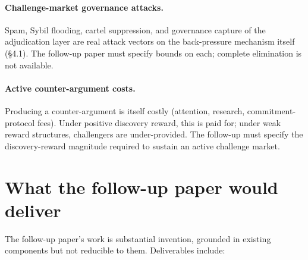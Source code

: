 \documentclass{article}
\begin{document}
\paragraph{Challenge-market governance attacks.}
Spam, Sybil flooding, cartel suppression, and governance capture
of the adjudication layer are real attack vectors on the
back-pressure mechanism itself (\S4.1).  The follow-up paper
must specify bounds on each; complete elimination is not
available.

\paragraph{Active counter-argument costs.}
Producing a counter-argument is itself costly (attention,
research, commitment-protocol fees).  Under positive discovery
reward, this is paid for; under weak reward structures,
challengers are under-provided.  The follow-up must specify the
discovery-reward magnitude required to sustain an active
challenge market.

\section{What the follow-up paper would deliver}

The follow-up paper's work is substantial invention, grounded in
existing components but not reducible to them.  Deliverables
include:
\end{document}
